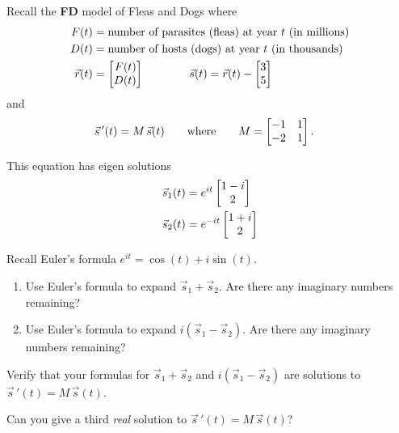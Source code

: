 \documentclass{workbook}
\begin{document}
\begin{slide}
	\question
 		Recall the \textbf{FD} model of Fleas and Dogs where 
	\begin{align*}
		F(t) &= \text{number of parasites (fleas) at year $t$ (in millions)}\\
		D(t) &= \text{number of hosts (dogs) at year $t$ (in thousands)}\\
		\vec r(t) &= \mat{F(t)\\D(t)} \qquad\qquad
		\vec s(t) = \vec r(t) - \mat{3\\5}
	\end{align*}
	and
	\begin{align*}
		\vec s\,'(t) &= M\,\vec s(t)\qquad\text{where}\qquad M=\mat{-1&1\\-2&1}.
	\end{align*}
	
	This equation has eigen solutions
	\begin{align*}
		\vec s_1(t) &= e^{it}\begin{bmatrix}1-i\\2\end{bmatrix}\\
		\vec s_2(t) &= e^{-it}\begin{bmatrix}1+i\\2\end{bmatrix}
	\end{align*}
	
	\begin{parts}
		\item Recall Euler's formula $e^{it}=\cos(t)+i\sin(t)$. 
		\begin{enumerate}
			\item Use Euler's formula to expand $\vec s_1 + \vec s_2$. Are there any imaginary numbers remaining?
			\item Use Euler's formula to expand $i(\vec s_1 - \vec s_2)$. Are there any imaginary numbers remaining?
		\end{enumerate}
		\item Verify that your formulas for $\vec s_1+\vec s_2$ and $i(\vec s_1-\vec s_2)$ are solutions to
			$\vec s\,'(t) = M\,\vec s(t)$.
		\item Can you give a third \emph{real} solution to $\vec s\,'(t) = M\,\vec s(t)$?
	\end{parts}
\end{slide}
\end{document}
